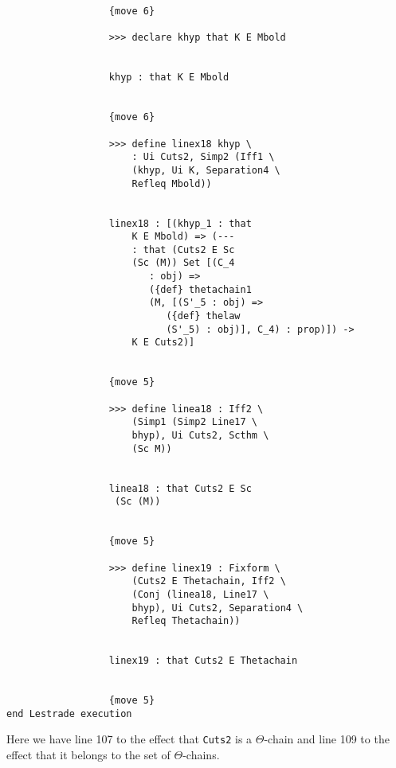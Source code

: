 \documentclass[12pt]{article}
\begin{document}
\begin{verbatim}
                  {move 6}

                  >>> declare khyp that K E Mbold


                  khyp : that K E Mbold


                  {move 6}

                  >>> define linex18 khyp \
                      : Ui Cuts2, Simp2 (Iff1 \
                      (khyp, Ui K, Separation4 \
                      Refleq Mbold))


                  linex18 : [(khyp_1 : that 
                      K E Mbold) => (--- 
                      : that (Cuts2 E Sc 
                      (Sc (M)) Set [(C_4 
                         : obj) => 
                         ({def} thetachain1 
                         (M, [(S'_5 : obj) => 
                            ({def} thelaw 
                            (S'_5) : obj)], C_4) : prop)]) -> 
                      K E Cuts2)]


                  {move 5}

                  >>> define linea18 : Iff2 \
                      (Simp1 (Simp2 Line17 \
                      bhyp), Ui Cuts2, Scthm \
                      (Sc M))


                  linea18 : that Cuts2 E Sc 
                   (Sc (M))


                  {move 5}

                  >>> define linex19 : Fixform \
                      (Cuts2 E Thetachain, Iff2 \
                      (Conj (linea18, Line17 \
                      bhyp), Ui Cuts2, Separation4 \
                      Refleq Thetachain))


                  linex19 : that Cuts2 E Thetachain


                  {move 5}
end Lestrade execution
\end{verbatim}

Here we have line 107 to the effect that {\tt Cuts2} is a $\Theta$-chain and line 109 to the effect that it belongs to the set of $\Theta$-chains.
\end{document}
